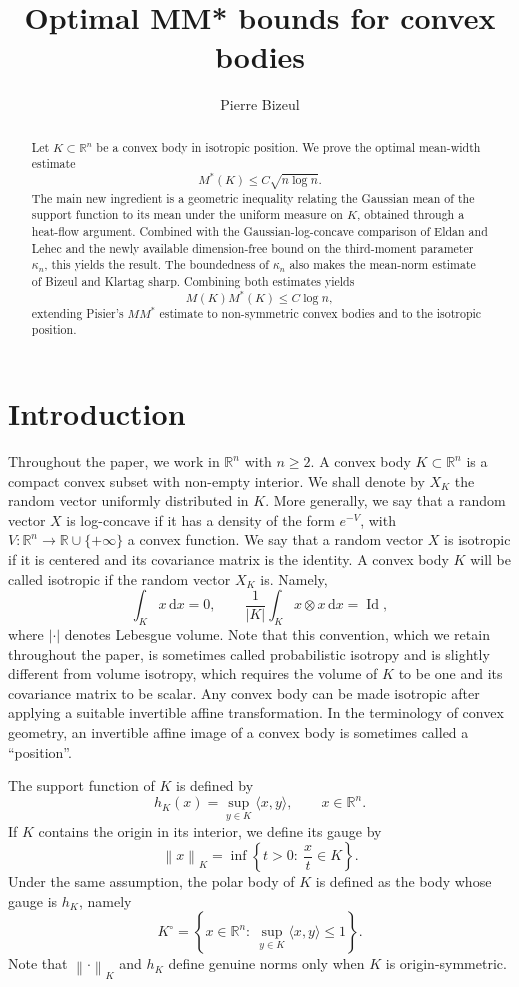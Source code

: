 \documentclass[12pt]{article}
\title{Optimal MM* bounds for convex bodies}
\author{Pierre Bizeul}
\date{}
\theoremstyle{definition}
\theoremstyle{remark}
\newcommand{\R}{\mathbb R}
\newcommand{\Id}{\operatorname{Id}}
\newcommand{\dd}{\,\mathrm d}
\newcommand{\norm}[1]{\left\lVert #1\right\rVert}
\begin{document}
\maketitle

\begin{abstract}
Let $K\subset\R^n$ be a convex body in isotropic position. We prove the
optimal mean-width estimate
\[
  M^*(K)\leq C\sqrt{n\log n}.
\]
The main new ingredient is a geometric inequality relating the Gaussian
mean of the support function to its mean under the uniform measure on
$K$, obtained through a heat-flow argument. Combined with the
Gaussian-log-concave comparison of Eldan and Lehec and the newly available
dimension-free bound on the third-moment parameter $\kappa_n$, this
yields the result. The boundedness of $\kappa_n$ also makes the mean-norm
estimate of Bizeul and Klartag sharp. Combining both estimates yields
\[
  M(K)M^*(K)\leq C\log n,
\]
extending Pisier's $MM^*$ estimate to non-symmetric convex bodies and to the isotropic position.
\end{abstract}



\section{Introduction}

Throughout the paper, we work in $\R^n$ with $n\geq2$. A convex body
$K\subset\R^n$ is a compact convex subset with non-empty interior. We
shall denote by $X_K$ the random vector uniformly distributed in $K$.
More generally, we say that a random vector $X$ is log-concave if it
has a density of the form $e^{-V}$, with
$V:\R^n\longrightarrow\R\cup\{+\infty\}$ a convex function. We say
that a random vector $X$ is isotropic if it is centered and its
covariance matrix is the identity. A convex body $K$ will be called
isotropic if the random vector $X_K$ is. Namely,
\[
  \int_K x\dd x=0,
  \qquad
  \frac1{|K|}\int_K x\otimes x\dd x=\Id,
\]
where $|\cdot|$ denotes Lebesgue volume. Note that this convention,
which we retain throughout the paper, is sometimes called
probabilistic isotropy and is slightly different from volume
isotropy, which requires the volume of $K$ to be one and its covariance
matrix to be scalar. Any convex body can be made isotropic after
applying a suitable invertible affine transformation. In the
terminology of convex geometry, an invertible affine image of a convex
body is sometimes called a ``position''.

The support function of $K$ is defined by
\[
  h_K(x)=\sup_{y\in K}\langle x,y\rangle,
  \qquad x\in\R^n.
\]
If $K$ contains the origin in its interior, we define its gauge by
\[
  \norm{x}_K
  =\inf\left\{t>0:\ \frac{x}{t}\in K\right\}.
\]
Under the same assumption, the polar body of $K$ is defined as the
body whose gauge is $h_K$, namely
\[
  K^\circ
  =
  \left\{
    x\in\R^n:\
    \sup_{y\in K}\langle x,y\rangle\leq1
  \right\}.
\]
Note that $\norm{\cdot}_K$ and $h_K$ define genuine norms only when
$K$ is origin-symmetric.
\end{document}
